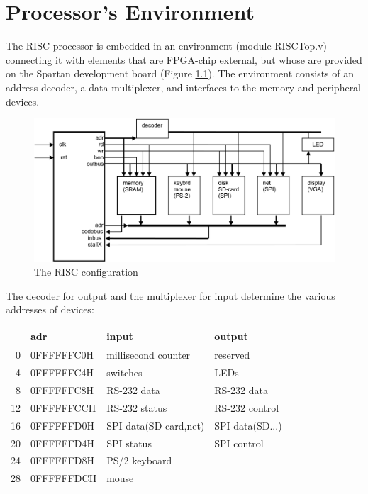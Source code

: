 \chapter{Processor's Environment}
\label{ch:env}
The RISC processor is embedded in an environment (module RISCTop.v) connecting it with elements that are
FPGA-chip external, but whose are provided on the Spartan development board (Figure \ref{fig:cfg}). The
environment consists of an address decoder, a data multiplexer, and interfaces to the memory and
peripheral devices.
\begin{figure}[h!]
  \flushleft
  \includegraphics[width=1.1\textwidth]{i/G/0.png}
  \caption{The RISC configuration}
  \label{fig:cfg}
\end{figure}

The decoder for output and the multiplexer for input determine the various addresses of devices:
\begin{table}[h!]
  \centering
  \begin{tabular}{r l l l}
       & adr        & input                 & output \\\hline
     0 & 0FFFFFFC0H & millisecond counter   & reserved \\
     4 & 0FFFFFFC4H & switches              & LEDs \\
     8 & 0FFFFFFC8H & RS-232 data           & RS-232 data \\
    12 & 0FFFFFFCCH & RS-232 status         & RS-232 control \\
    16 & 0FFFFFFD0H & SPI data(SD-card,net) & SPI data(SD...) \\
    20 & 0FFFFFFD4H & SPI status            & SPI control \\
    24 & 0FFFFFFD8H & PS/2 keyboard \\
    28 & 0FFFFFFDCH & mouse
  \end{tabular}
\end{table}

